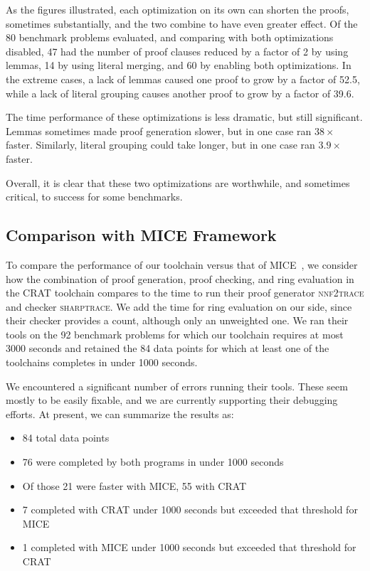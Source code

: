 \documentclass[letterpaper,USenglish,cleveref, autoref, thm-restate]{lipics-v2021}
\newcommand{\progname}[1]{\textsc{#1}}
\begin{document}
As the figures illustrated, each optimization on its own can shorten
the proofs, sometimes substantially, and the two combine to have even
greater effect.  Of the 80 benchmark problems evaluated, and comparing
with both optimizations disabled, 47 had the number of proof clauses
reduced by a factor of 2 by using lemmas, 14 by using literal merging,
and 60 by enabling both optimizations.  In the extreme cases, a lack
of lemmas caused one proof to grow by a factor of 52.5, while a lack
of literal grouping causes another proof to grow by a factor of 39.6.

The time performance of these optimizations is less dramatic, but
still significant.  Lemmas sometimes made proof generation slower, but
in one case ran $38\times$ faster.  Similarly, literal grouping could
take longer, but in one case ran $3.9\times$ faster.

Overall, it is clear that these two optimizations are worthwhile, and
sometimes critical, to success for some benchmarks.

\subsection{Comparison with MICE Framework}

To compare the performance of our toolchain versus that of
MICE~\cite{fichte:sat:2022}, we consider how the combination of proof
generation, proof checking, and ring evaluation in the CRAT toolchain compares to the time to
run their proof generator \progname{nnf2trace} and checker
\progname{sharptrace}.  We add the time for ring evaluation on our
side, since their checker provides a count, although only an
unweighted one.  We ran their tools on the 92 benchmark problems for
which our toolchain requires at most 3000 seconds and retained
the 84 data points for which at least one of the toolchains completes in under 1000 seconds.

We encountered a significant number of errors running their tools.
These seem mostly to be easily fixable, and we are currently
supporting their debugging efforts.  At present, we can summarize the results as:
\begin{itemize}
\item 84 total data points
\item 76 were completed by both programs in under 1000 seconds
\item Of those 21 were faster with MICE, 55 with CRAT
\item 7 completed with CRAT under 1000 seconds but exceeded that threshold for MICE
\item 1 completed with MICE under 1000 seconds but exceeded that threshold for CRAT
\end{itemize}
\end{document}
